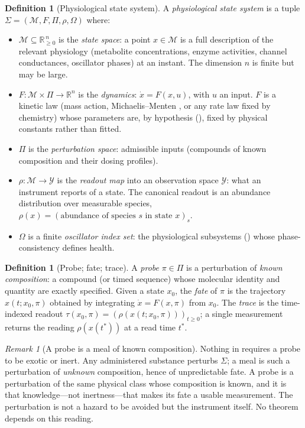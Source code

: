 \documentclass[11pt,a4paper]{article}
\theoremstyle{cfcthm}
\theoremstyle{definition}
\newtheorem{definition}[theorem]{Definition}
\theoremstyle{remark}
\newtheorem{remark}[theorem]{Remark}
\newcommand{\R}{\mathbb{R}}
\newcommand{\Rp}{\R_{\ge 0}}
\newcommand{\Man}{\mathcal{M}}          %
\newcommand{\st}{x}                     %
\newcommand{\probe}{\pi}                %
\newcommand{\Probe}{\Pi}                %
\newcommand{\trace}{\tau}               %
\newcommand{\Rd}{\rho}                  %
\newcommand{\intv}{u}                   %
\newcommand{\Dom}{\Omega}               %
\begin{document}
\begin{definition}[Physiological state system]
\label{def:system}
A \emph{physiological state system} is a tuple
$\Sigma=(\Man,F,\Probe,\Rd,\Dom)$ where:
\begin{itemize}[leftmargin=1.4em,itemsep=2pt]
\item $\Man\subseteq\Rp^{\,n}$ is the \emph{state space}: a point $\st\in\Man$
is a full description of the relevant physiology (metabolite concentrations,
enzyme activities, channel conductances, oscillator phases) at an instant. The
dimension $n$ is finite but may be large.
\item $F\colon\Man\times\Probe\to\R^{n}$ is the \emph{dynamics}:
$\dot\st=F(\st,\intv)$, with $\intv$ an input. $F$ is a kinetic law (mass
action, Michaelis--Menten \citep{michaelis1913}, or any rate law fixed by
chemistry) whose parameters are, by hypothesis (), fixed by
physical constants rather than fitted.
\item $\Probe$ is the \emph{perturbation space}: admissible inputs (compounds
of known composition and their dosing profiles).
\item $\Rd\colon\Man\to\mathcal{Y}$ is the \emph{readout map} into an
observation space $\mathcal{Y}$: what an instrument reports of a state. The
canonical readout is an abundance distribution over measurable species,
$\Rd(\st)=(\text{abundance of species }s\text{ in state }\st)_{s}$.
\item $\Dom$ is a finite \emph{oscillator index set}: the physiological
subsystems () whose phase-consistency defines health.
\end{itemize}
\end{definition}

\begin{definition}[Probe; fate; trace]
\label{def:probe}
A \emph{probe} $\probe\in\Probe$ is a perturbation of \emph{known
composition}: a compound (or timed sequence) whose molecular identity and
quantity are exactly specified. Given a state $\st_0$, the \emph{fate} of
$\probe$ is the trajectory $\st(t;\st_0,\probe)$ obtained by integrating
$\dot\st=F(\st,\probe)$ from $\st_0$. The \emph{trace} is the time-indexed
readout $\trace(\st_0,\probe)=(\Rd(\st(t;\st_0,\probe)))_{t\ge0}$; a single
measurement returns the reading $\Rd(\st(t^{\ast}))$ at a read time
$t^{\ast}$.
\end{definition}

\begin{remark}[A probe is a meal of known composition]
\label{rem:meal}
Nothing in  requires a probe to be exotic or inert. Any
administered substance perturbs $\Sigma$; a meal is such a perturbation of
\emph{unknown} composition, hence of unpredictable fate. A probe is a
perturbation of the same physical class whose composition is known, and it is
that knowledge---not inertness---that makes its fate a usable measurement. The
perturbation is not a hazard to be avoided but the instrument itself. No
theorem depends on this reading.
\end{remark}
\end{document}
